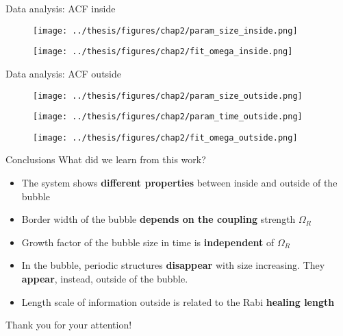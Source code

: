 \documentclass[aspectratio=169]{beamer}
\newcommand{\backupbegin}{
    \newcounter{finalframe}
    \setcounter{finalframe}{\value{framenumber}}
}
\newcommand{\backupend}{
    \setcounter{framenumber}{\value{finalframe}}
}
\begin{document}
\begin{frame}{Data analysis: ACF inside}
  \begin{figure}
      \centering
      \texttt{[image: ../thesis/figures/chap2/param\_size\_inside.png]}
  \end{figure}
  \vspace{-0.5cm}
  \begin{figure}
      \centering
      \texttt{[image: ../thesis/figures/chap2/fit\_omega\_inside.png]}
  \end{figure}
\end{frame}

\begin{frame}{Data analysis: ACF outside}
  \begin{figure}
      \centering
      \begin{minipage}[t]{0.47 \textwidth}
          \centering
          \texttt{[image: ../thesis/figures/chap2/param\_size\_outside.png]}
      \end{minipage}
      \hspace{0.02\textwidth}
      \begin{minipage}[t]{0.47 \textwidth}
          \centering
          \texttt{[image: ../thesis/figures/chap2/param\_time\_outside.png]}
      \end{minipage}
  \end{figure}
  \vspace{-0.5cm}
  \begin{figure}
      \centering
      \texttt{[image: ../thesis/figures/chap2/fit\_omega\_outside.png]}
  \end{figure}
\end{frame}

\begin{frame}{Conclusions}
  What did we learn from this work?
  \begin{itemize}
      \item The system shows \textbf{different properties} between inside and outside of the bubble
      \item Border width of the bubble \textbf{depends on the coupling} strength $\Omega_R$
      \item Growth factor of the bubble size in time is \textbf{independent} of $\Omega_R$
      \item In the bubble, periodic structures \textbf{disappear} with size increasing. They \textbf{appear}, instead, outside of the bubble.
      \item Length scale of information outside is related to the Rabi \textbf{healing length}
  \end{itemize}
\end{frame}

\begin{frame}
  \huge
  Thank you for your attention!
\end{frame}

  
\end{document}
